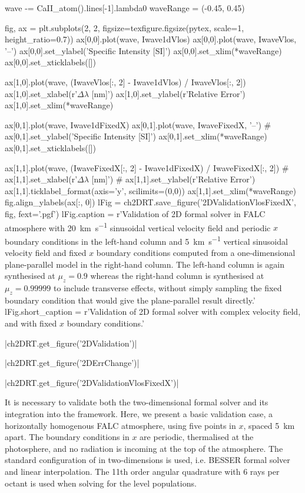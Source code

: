 \begin{pycode}[2DValidation]
wave -= CaII_atom().lines[-1].lambda0
waveRange = (-0.45, 0.45)

fig, ax = plt.subplots(2, 2, figsize=texfigure.figsize(pytex, scale=1, height_ratio=0.7))
ax[0,0].plot(wave, Iwave1dVlos)
ax[0,0].plot(wave, IwaveVlos, '--')
ax[0,0].set_ylabel('Specific Intensity [SI]')
ax[0,0].set_xlim(*waveRange)
ax[0,0].set_xticklabels([])

ax[1,0].plot(wave, (IwaveVlos[:, 2] - Iwave1dVlos) / IwaveVlos[:, 2])
ax[1,0].set_xlabel(r'$\Delta\lambda$ [\si{\nano\metre}]')
ax[1,0].set_ylabel(r'Relative Error')
ax[1,0].set_xlim(*waveRange)

ax[0,1].plot(wave, Iwave1dFixedX)
ax[0,1].plot(wave, IwaveFixedX, '--')
# ax[0,1].set_ylabel('Specific Intensity [SI]')
ax[0,1].set_xlim(*waveRange)
ax[0,1].set_xticklabels([])

ax[1,1].plot(wave, (IwaveFixedX[:, 2] - Iwave1dFixedX) / IwaveFixedX[:, 2])
# ax[1,1].set_xlabel(r'$\Delta\lambda$ [\si{\nano\metre}]')
# ax[1,1].set_ylabel(r'Relative Error')
ax[1,1].ticklabel_format(axis='y', scilimits=(0,0))
ax[1,1].set_xlim(*waveRange)
fig.align_ylabels(ax[:, 0])
lFig = ch2DRT.save_figure('2DValidationVlosFixedX', fig, fext='.pgf')
lFig.caption = r'Validation of 2D formal solver in FALC atmosphere with \SI{20}{\kilo\metre\per\second} sinusoidal vertical velocity field and periodic $x$ boundary conditions in the left-hand column and \SI{5}{\kilo\metre\per\second} vertical sinusoidal velocity field and fixed $x$ boundary conditions computed from a one-dimensional plane-parallel model in the right-hand column. The left-hand column is again synthesised at $\mu_z=0.9$ whereas the right-hand column is synthesised at $\mu_z=0.99999$ to include transverse effects, without simply sampling the fixed boundary condition that would give the plane-parallel result directly.'
lFig.short_caption = r'Validation of 2D formal solver with complex velocity field, and with fixed $x$ boundary conditions.'
\end{pycode}

\py[2DValidation]|ch2DRT.get_figure('2DValidation')|

\py[2DValidation]|ch2DRT.get_figure('2DErrChange')|

\py[2DValidation]|ch2DRT.get_figure('2DValidationVlosFixedX')|


It is necessary to validate both the two-dimensional formal solver and its integration into the \Lw{} framework.
Here, we present a basic validation case, a horizontally homogenous FALC atmosphere, using five points in $x$, spaced \SI{5}{\kilo\metre} apart.
The boundary conditions in $x$ are periodic, thermalised at the photosphere, and no radiation is incoming at the top of the atmosphere.
The standard configuration of \Lw{} in two-dimensions is used, i.e. BESSER formal solver and linear interpolation.
The 11th order angular quadrature with 6 rays per octant \citep{Stepan2020} is used when solving for the level populations.

